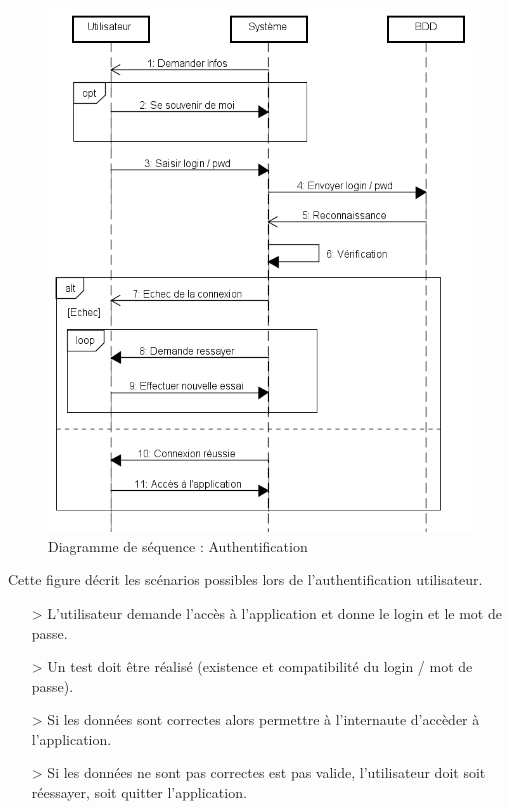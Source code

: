 \begin{figure}[h]
	\centering
	\includegraphics[width=1\linewidth]{"Chapitre3/images/sd/Authentification"}
	\caption{Diagramme de séquence : Authentification}
	\label{Diagramme de séquence : Authentification}
\end{figure}

\clearpage

Cette figure décrit les scénarios possibles lors de l'authentification utilisateur.

\begin{itemize}
	\item [\textgreater] L'utilisateur demande l'accès à l'application et donne le login et le mot de passe. 
	\item [\textgreater] Un test doit être réalisé (existence et compatibilité du login / mot de passe).
	\item [\textgreater] Si les données sont correctes alors permettre à l'internaute d'accèder à l'application.
	\item [\textgreater] Si les données ne sont pas correctes est pas valide, l'utilisateur doit soit réessayer, soit quitter l'application.
\end{itemize}
\medskip

